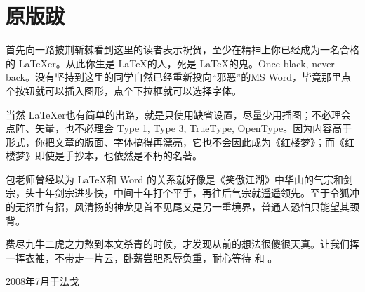\chapter{原版跋}

首先向一路披荆斩棘看到这里的读者表示祝贺，至少在精神上你已经成为一名合格的 \LaTeX{}er。从此你生是 \LaTeX 的人，死是 \LaTeX 的鬼。Once black, never back。没有坚持到这里的同学自然已经重新投向“邪恶”的MS Word，毕竟那里点个按钮就可以插入图形，点个下拉框就可以选择字体。

当然 \LaTeX{}er也有简单的出路，就是只使用缺省设置，尽量少用插图；不必理会点阵、矢量，也不必理会 Type 1, Type 3, TrueType, OpenType。因为内容高于形式，你把文章的版面、字体搞得再漂亮，它也不会因此成为《红楼梦》；而《红楼梦》即使是手抄本，也依然是不朽的名著。

包老师曾经以为 \LaTeX 和 Word 的关系就好像是《笑傲江湖》中华山的气宗和剑宗，头十年剑宗进步快，中间十年打个平手，再往后气宗就遥遥领先。至于令狐冲的无招胜有招，风清扬的神龙见首不见尾又是另一重境界，普通人恐怕只能望其颈背。

费尽九牛二虎之力熬到本文杀青的时候，才发现从前的想法很傻很天真。让我们挥一挥衣袖，不带走一片云，卧薪尝胆忍辱负重，耐心等待 \XeTeX 和 \LuaTeX。

\begin{flushright}
  2008年7月于法戈
\end{flushright}
